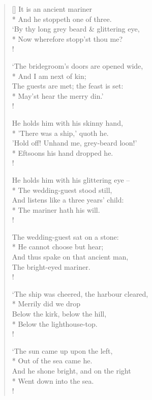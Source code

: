 \documentclass[MAIN]{subfiles}
\begin{document}
\settowidth{\versewidth}{`By thy long grey beard \& glittering eye,}
\begin{verse}[\versewidth]
 It is an ancient mariner\\*
\vin And he stoppeth one of three.\\
`By thy long grey beard \& glittering eye,\\*
\vin Now wherefore stopp'st thou me?\\!

`The bridegroom's doors are opened wide,\\*
\vin And I am next of kin;\\
The guests are met; the feast is set:\\*
\vin May'st hear the merry din.'\\!

He holds him with his skinny hand,\\*
\vin 'There was a ship,' quoth he.\\
'Hold off! Unhand me, grey-beard loon!'\\*
\vin Eftsoons his hand dropped he.\\!

He holds him with his glittering eye --\\*
\vin The wedding-guest stood still,\\
And listens like a three years' child:\\*
\vin The mariner hath his will.\\!

The wedding-guest sat on a stone:\\*
\vin He cannot choose but hear;\\
And thus spake on that ancient man,\\
\vin The bright-eyed mariner.\\!

`The ship was cheered, the harbour cleared,\\*
\vin Merrily did we drop\\
Below the kirk, below the hill,\\*
\vin Below the lighthouse-top.\\!

`The sun came up upon the left,\\*
\vin Out of the sea came he.\\
And he shone bright, and on the right\\*
\vin Went down into the sea.\\!


\end{verse}
\end{document}

